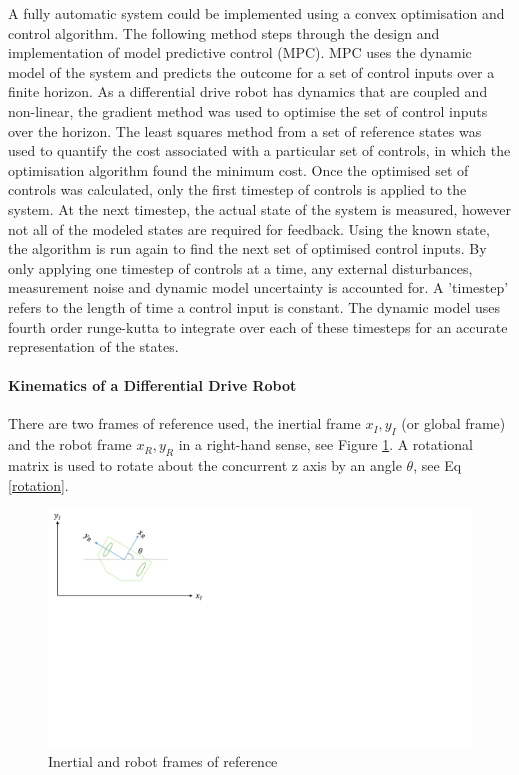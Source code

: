 \documentclass[MTRX3700report.tex]{subfiles}
\begin{document}
A fully automatic system could be implemented using a convex optimisation and control algorithm. The following method steps through the design and implementation of model predictive control (MPC). MPC uses the dynamic model of the system and predicts the outcome for a set of control inputs over a finite horizon. As a differential drive robot has dynamics that are coupled and non-linear, the gradient method was used to optimise the set of control inputs over the horizon. The least squares method from a set of reference states was used to quantify the cost associated with a particular set of controls, in which the optimisation algorithm found the minimum cost. Once the optimised set of controls was calculated, only the first timestep of controls is applied to the system. At the next timestep, the actual state of the system is measured, however not all of the modeled states are required for feedback. Using the known state, the algorithm is run again to find the next set of optimised control inputs. By only applying one timestep of controls at a time, any external disturbances, measurement noise and dynamic model uncertainty is accounted for. A 'timestep' refers to the length of time a control input is constant. The dynamic model uses fourth order runge-kutta to integrate over each of these timesteps for an accurate representation of the states.




\paragraph{Kinematics of a Differential Drive Robot}
There are two frames of reference used, the inertial frame $x_I,y_I$ (or global frame) and the robot frame $x_R,y_R$ in a right-hand sense, see Figure \ref{fig:robotdiagram}. A rotational matrix is used to rotate about the concurrent z axis by an angle $\theta$, see Eq \eqref{rotation}.

\begin{figure}
\centering
\includegraphics[clip,trim=0 11cm 21.5cm 0  ,width=0.5\linewidth]{./robotdiagram.pdf}
\caption{Inertial and robot frames of reference}
\label{fig:robotdiagram}
\end{figure}
\end{document}
